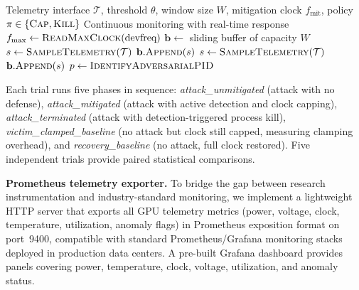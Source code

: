 \documentclass[conference]{IEEEtran}
\begin{document}
\begin{algorithm}[t]
\caption{Closed-Loop GPU Power Attack Mitigation}
\label{alg:mitigate}
\begin{algorithmic}[1]
\Require Telemetry interface $\mathcal{T}$, threshold $\theta$,
  window size $W$, mitigation clock $f_{\mathrm{mit}}$,
  policy $\pi \in \{\textsc{Cap}, \textsc{Kill}\}$
\Ensure Continuous monitoring with real-time response
\State $f_{\max} \gets \Call{ReadMaxClock}{\text{devfreq}}$
\State $\mathbf{b} \gets$ sliding buffer of capacity $W$
  \State $s \gets \Call{SampleTelemetry}{\mathcal{T}}$
  \State $\mathbf{b}.\Call{Append}{s}$
      \State {}
        \State {}
          \State $s \gets \Call{SampleTelemetry}{\mathcal{T}}$
          \State $\mathbf{b}.\Call{Append}{s}$
        \EndWhile
        \State {}
        \State $p \gets \Call{IdentifyAdversarialPID}{}$
        \State {}
          \State {}
        \EndIf
        \State {}
      \EndIf
    \EndIf
  \EndIf
\EndWhile
\end{algorithmic}
\end{algorithm}

Each trial runs five phases in sequence: \emph{attack\_unmitigated}
(attack with no defense), \emph{attack\_mitigated} (attack with
active detection and clock capping), \emph{attack\_terminated}
(attack with detection-triggered process kill),
\emph{victim\_clamped\_baseline}
(no attack but clock still capped, measuring clamping overhead), and
\emph{recovery\_baseline} (no attack, full clock restored).  Five
independent trials provide paired statistical comparisons.

\textbf{Prometheus telemetry exporter.}
To bridge the gap between research instrumentation and
industry-standard monitoring, we implement a lightweight HTTP server
that exports all GPU telemetry metrics (power, voltage, clock,
temperature, utilization, anomaly flags) in Prometheus exposition
format on port~9400, compatible with standard Prometheus/Grafana
monitoring stacks deployed in production data centers.  A pre-built
Grafana dashboard provides panels covering power, temperature, clock,
voltage, utilization, and anomaly status.
\end{document}
